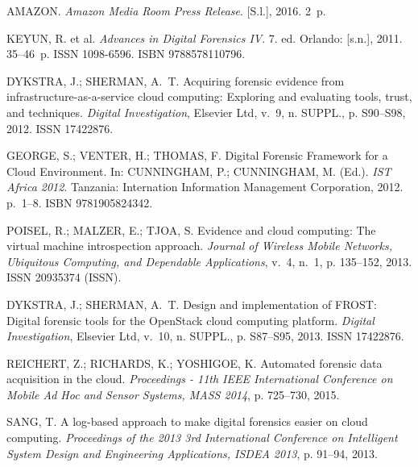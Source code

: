 \documentclass[conference]{IEEEtran}
\begin{document}
%
%
%
\begin{thebibliography}{1}

{AMAZON. \emph{{Amazon Media Room Press Release}}.
[S.l.], 2016. 2~p.}

{KEYUN, R. et al. \emph{{Advances in Digital Forensics IV}}. 7. ed. Orlando:
  [s.n.], 2011. 35--46~p.
ISSN 1098-6596.
ISBN 9788578110796.}

{DYKSTRA, J.; SHERMAN, A.~T. {Acquiring forensic evidence from
  infrastructure-as-a-service cloud computing: Exploring and evaluating tools,
  trust, and techniques}.
\emph{Digital Investigation}, Elsevier Ltd, v.~9, n. SUPPL., p. S90--S98, 2012.
ISSN 17422876.}
  
GEORGE, S.; VENTER, H.; THOMAS, F. {Digital Forensic Framework for a Cloud
  Environment. In:  CUNNINGHAM, P.; CUNNINGHAM, M. (Ed.). \emph{IST Africa
  2012}. Tanzania: Internation Information Management Corporation, 2012.
  p.~1--8.
  ISBN 9781905824342.}
  
{POISEL, R.; MALZER, E.; TJOA, S. {Evidence and cloud computing: The virtual
  machine introspection approach}.
\emph{Journal of Wireless Mobile Networks, Ubiquitous Computing, and Dependable
  Applications}, v.~4, n.~1, p. 135--152, 2013.
ISSN 20935374 (ISSN).}

{DYKSTRA, J.; SHERMAN, A.~T. {Design and implementation of FROST: Digital
  forensic tools for the OpenStack cloud computing platform}.
\emph{Digital Investigation}, Elsevier Ltd, v.~10, n. SUPPL., p. S87--S95,
  2013.
ISSN 17422876.}

{REICHERT, Z.; RICHARDS, K.; YOSHIGOE, K. {Automated forensic data acquisition
  in the cloud}.
\emph{Proceedings - 11th IEEE International Conference on Mobile Ad Hoc and
  Sensor Systems, MASS 2014}, p. 725--730, 2015.}

{SANG, T. {A log-based approach to make digital forensics easier on cloud
  computing}.
\emph{Proceedings of the 2013 3rd International Conference on Intelligent
  System Design and Engineering Applications, ISDEA 2013}, p. 91--94, 2013.}
  

\end{thebibliography}
\end{document}
